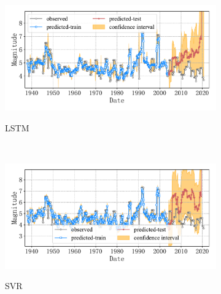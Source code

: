 \begin{figure}[!htbp]
  \centering
  \begin{subfigure}[b]{0.45\textwidth}
    \caption{LSTM}
    \vspace{-0.2cm}
    \includegraphics[width=\textwidth]{Img/chap5_seism/block3/seism_lstm_minyear_1932_maxyear_2021_spanlat_2_spanlon_4_timewindow_72_nextmonth_12_minmag_3.0_block_3.pdf}
    \vspace{-1cm}
    \label{fig:seism_lstm_minyear_1932_maxyear_2021_spanlat_2_spanlon_4_timewindow_72_nextmonth_12_minmag_3.0_block_3}
  \end{subfigure}
  ~
  \begin{subfigure}[b]{0.45\textwidth}
    \caption{SVR} 
    \vspace{-0.2cm}
    \includegraphics[width=\textwidth]{Img/chap5_seism/block3/seism_svr_minyear_1932_maxyear_2021_spanlat_2_spanlon_4_timewindow_72_nextmonth_12_minmag_3.0_block_3.pdf}
    \vspace{-1cm}
    \label{fig:seism_svr_minyear_1932_maxyear_2021_spanlat_2_spanlon_4_timewindow_72_nextmonth_12_minmag_3.0_block_3}
  \end{subfigure}   
  \\
  \begin{subfigure}[b]{0.45\textwidth}

\end{subfigure}
\end{figure}
